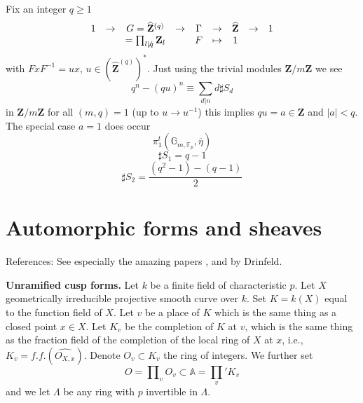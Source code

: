 \begin{example}
\label{example-commutative}
Fix an integer $q\geq 1$
$$
\begin{matrix}
1 &
\to &
G = \widehat{\mathbf{Z}}^{(q)} &
\to &
\Gamma &
\to &
\widehat{\mathbf{Z}} &
\to &
1 \\
&
&
= \prod_{l\not \mid q} \mathbf{Z}_l &
&
F &
\mapsto &
1
\end{matrix}
$$
with $FxF^{-1} = ux$, $u \in (\widehat{\mathbf{Z}}^{(q)})^*$.
Just using the trivial modules
$\mathbf{Z}/m\mathbf{Z}$ we see
$$
q^n-(qu)^n\equiv \sum_{d|n} d\sharp S_d
$$
in $\mathbf{Z}/m\mathbf{Z}$ for all $(m, q)=1$ (up to
$u \to u^{-1}$) this implies $qu = a\in \mathbf{Z}$
and $|a| < q$. The special case $a = 1$ does occur
$$
\pi_1^t(\mathbb G_{m, \mathbb F_p}, \overline \eta)
$$
$$
\sharp S_1 = q-1
$$
$$
\sharp S_2 = \frac{(q^2-1)-(q-1)}{2}
$$



\end{example}



\section{Automorphic forms and sheaves}
\label{section-automorphic}

\noindent
References: See especially the amazing papers
\cite{D1}, \cite{D2} and \cite{D0} by Drinfeld.

\medskip\noindent
{\bf Unramified cusp forms.}
Let $k$ be a finite field of characteristic $p$.
Let $X$ geometrically irreducible projective smooth curve over $k$.
Set $K = k(X)$ equal to the function field of $X$.
Let $v$ be a place of $K$ which is the same thing as a
closed point $x\in X$. Let $K_v$ be the completion of $K$ at $v$, which
is the same thing as the fraction field of the completion of
the local ring of $X$ at $x$, i.e., $K_v = f.f.(\widehat{O_{X, x}})$.
Denote $O_v\subset K_v$ the ring of integers. We further set
$$
O = \prod\nolimits_v O_v \subset \mathbb A = \prod_v' K_v
$$
and we let $\Lambda$ be any ring with $p$ invertible in $\Lambda$.

